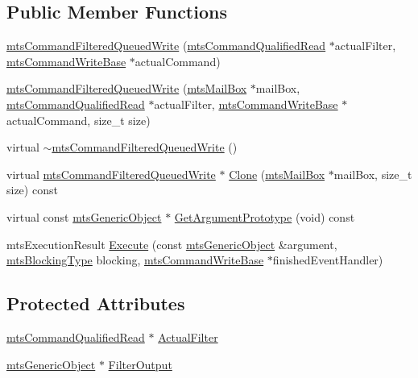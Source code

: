 \subsection*{Public Member Functions}
\begin{DoxyCompactItemize}
\item 
\hyperlink{classmts_command_filtered_queued_write_ab01016fda86f12a553c5b7cb96598d67}{mts\+Command\+Filtered\+Queued\+Write} (\hyperlink{classmts_command_qualified_read}{mts\+Command\+Qualified\+Read} $\ast$actual\+Filter, \hyperlink{classmts_command_write_base}{mts\+Command\+Write\+Base} $\ast$actual\+Command)
\item 
\hyperlink{classmts_command_filtered_queued_write_a0eb986c33def2704bf514fa4b9868ef1}{mts\+Command\+Filtered\+Queued\+Write} (\hyperlink{classmts_mail_box}{mts\+Mail\+Box} $\ast$mail\+Box, \hyperlink{classmts_command_qualified_read}{mts\+Command\+Qualified\+Read} $\ast$actual\+Filter, \hyperlink{classmts_command_write_base}{mts\+Command\+Write\+Base} $\ast$actual\+Command, size\+\_\+t size)
\item 
virtual \hyperlink{classmts_command_filtered_queued_write_a94068246efae390821532312462eda7b}{$\sim$mts\+Command\+Filtered\+Queued\+Write} ()
\item 
virtual \hyperlink{classmts_command_filtered_queued_write}{mts\+Command\+Filtered\+Queued\+Write} $\ast$ \hyperlink{classmts_command_filtered_queued_write_a43b5f03075b7403afec8db6afb7c1e0d}{Clone} (\hyperlink{classmts_mail_box}{mts\+Mail\+Box} $\ast$mail\+Box, size\+\_\+t size) const 
\item 
virtual const \hyperlink{classmts_generic_object}{mts\+Generic\+Object} $\ast$ \hyperlink{classmts_command_filtered_queued_write_a576ba5d70031bcbc36b8243c8c1ee0b3}{Get\+Argument\+Prototype} (void) const 
\item 
mts\+Execution\+Result \hyperlink{classmts_command_filtered_queued_write_aff8888085a9797ea557a097f07dd742b}{Execute} (const \hyperlink{classmts_generic_object}{mts\+Generic\+Object} \&argument, \hyperlink{mts_forward_declarations_8h_ad7426ccb6c883bc780d0ee197dddcbe7}{mts\+Blocking\+Type} blocking, \hyperlink{classmts_command_write_base}{mts\+Command\+Write\+Base} $\ast$finished\+Event\+Handler)
\end{DoxyCompactItemize}
\subsection*{Protected Attributes}
\begin{DoxyCompactItemize}
\item 
\hyperlink{classmts_command_qualified_read}{mts\+Command\+Qualified\+Read} $\ast$ \hyperlink{classmts_command_filtered_queued_write_a718a512e857afbb05d1b4ab6886b57f5}{Actual\+Filter}
\item 
\hyperlink{classmts_generic_object}{mts\+Generic\+Object} $\ast$ \hyperlink{classmts_command_filtered_queued_write_a485105f94a78b6a6ef600c3dbf9140d0}{Filter\+Output}
\end{DoxyCompactItemize}
